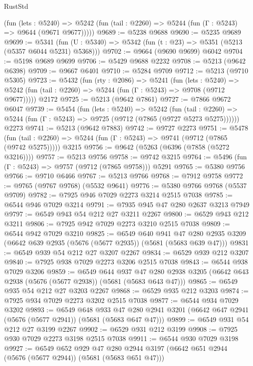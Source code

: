 \begin{lexlean}{RustStd}
\begin{coremodule}
      (fun (lets : @5240) =>
      @5242 (fun (tail : @2260) => @5244 (fun (Γ : @5243) => @9644 (@9671 @9677)))))
@9689 := @5238 @9688
@9690 := @5235 @9689
@9699 := @5341 (fun (U : @5340) => @5342 (fun (t : @23) => @5351 (@5213 (@5357 @6044 @5231) @5368)))
@9702 := @9664 (@9690 @9699) @6042
@9704 := @5198 @9689 @9699
@9706 := @5429 @9688 @2232
@9708 := @5213 (@9642 @6398)
@9709 := @9667 @6401
@9710 := @5284 @9709
@9712 := @5213 (@9710 @5305)
@9723 := @5432
    (fun (rty : @2086) =>
    @5241
      (fun (lets : @5240) =>
      @5242 (fun (tail : @2260) => @5244 (fun (Γ : @5243) => @9708 (@9712 @9677)))))
    @2172
@9725 := @5213 (@9642 @7861)
@9727 := @7866 @9672 @6047
@9739 := @5454
    (fun (lets : @5240) =>
    @5242
      (fun (tail : @2260) => @5244 (fun (Γ : @5243) => @9725 (@9712 (@7865 (@9727 @5273 @5275))))))
    @2273
@9741 := @5213 (@9642 @7883)
@9742 := @9727 @2273
@9751 := @5478
    (fun (tail : @2260) => @5244 (fun (Γ : @5243) => @9741 (@9712 (@7865 (@9742 @5275)))))
    @3215
@9756 := @9642 (@5263 (@6396 (@7858 (@5272 @3216))))
@9757 := @5213 @9756
@9758 := @9742 @3215
@9764 := @5496 (fun (Γ : @5243) => @9757 (@9712 (@7865 @9758))) @5291
@9765 := @5380 @9756
@9766 := @9710 @6466
@9767 := @5213 @9766
@9768 := @7912 @9758
@9772 := @9765 (@9767 @9768) (@5532 @9641)
@9776 := @5380 @9766 @9768 (@5537 @9709)
@9782 := @7925 @946 @7029 @2273 @3214 @2515 @7038
@9785 := @6544 @946 @7029 @3214
@9791 := @7935 @945 @47 @280 @2637 @3213 @7949
@9797 := @6549 @943 @54 @212 @27 @3211 @2267
@9800 := @6529 @943 @212 @3211
@9806 := @7925 @942 @7029 @2273 @3210 @2515 @7038
@9809 := @6544 @942 @7029 @3210
@9825 := @6549
    @640
    @941
    @47
    @280
    @2935
    @3209
    (@6642 @639 @2935 (@5676 (@5677 @2935)) (@5681 (@5683 @639 @47)))
@9831 := @6549 @939 @54 @212 @27 @3207 @2267
@9834 := @6529 @939 @212 @3207
@9840 := @7925 @938 @7029 @2273 @3206 @2515 @7038
@9843 := @6544 @938 @7029 @3206
@9859 := @6549
    @644
    @937
    @47
    @280
    @2938
    @3205
    (@6642 @643 @2938 (@5676 (@5677 @2938)) (@5681 (@5683 @643 @47)))
@9865 := @6549 @935 @54 @212 @27 @3203 @2267
@9868 := @6529 @935 @212 @3203
@9874 := @7925 @934 @7029 @2273 @3202 @2515 @7038
@9877 := @6544 @934 @7029 @3202
@9893 := @6549
    @648
    @933
    @47
    @280
    @2941
    @3201
    (@6642 @647 @2941 (@5676 (@5677 @2941)) (@5681 (@5683 @647 @47)))
@9899 := @6549 @931 @54 @212 @27 @3199 @2267
@9902 := @6529 @931 @212 @3199
@9908 := @7925 @930 @7029 @2273 @3198 @2515 @7038
@9911 := @6544 @930 @7029 @3198
@9927 := @6549
    @652
    @929
    @47
    @280
    @2944
    @3197
    (@6642 @651 @2944 (@5676 (@5677 @2944)) (@5681 (@5683 @651 @47)))

\end{coremodule}
\end{lexlean}
